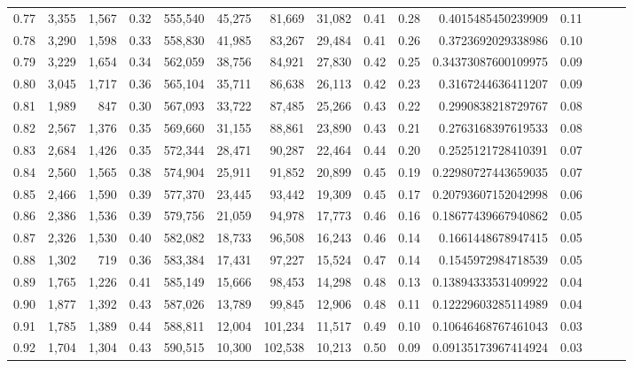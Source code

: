 \begin{tabular}{rrrrrrrrrrrrrrr}
0.77 &   3,355 &  1,567 &  0.32 &  555,540 &   45,275 &   81,669 &   31,082 &  0.41 &  0.28 &   0.4015485450239909 &      0.11 \\
0.78 &   3,290 &  1,598 &  0.33 &  558,830 &   41,985 &   83,267 &   29,484 &  0.41 &  0.26 &   0.3723692029338986 &      0.10 \\
0.79 &   3,229 &  1,654 &  0.34 &  562,059 &   38,756 &   84,921 &   27,830 &  0.42 &  0.25 &  0.34373087600109975 &      0.09 \\
0.80 &   3,045 &  1,717 &  0.36 &  565,104 &   35,711 &   86,638 &   26,113 &  0.42 &  0.23 &   0.3167244636411207 &      0.09 \\
0.81 &   1,989 &    847 &  0.30 &  567,093 &   33,722 &   87,485 &   25,266 &  0.43 &  0.22 &   0.2990838218729767 &      0.08 \\
0.82 &   2,567 &  1,376 &  0.35 &  569,660 &   31,155 &   88,861 &   23,890 &  0.43 &  0.21 &   0.2763168397619533 &      0.08 \\
0.83 &   2,684 &  1,426 &  0.35 &  572,344 &   28,471 &   90,287 &   22,464 &  0.44 &  0.20 &   0.2525121728410391 &      0.07 \\
0.84 &   2,560 &  1,565 &  0.38 &  574,904 &   25,911 &   91,852 &   20,899 &  0.45 &  0.19 &  0.22980727443659035 &      0.07 \\
0.85 &   2,466 &  1,590 &  0.39 &  577,370 &   23,445 &   93,442 &   19,309 &  0.45 &  0.17 &  0.20793607152042998 &      0.06 \\
0.86 &   2,386 &  1,536 &  0.39 &  579,756 &   21,059 &   94,978 &   17,773 &  0.46 &  0.16 &  0.18677439667940862 &      0.05 \\
0.87 &   2,326 &  1,530 &  0.40 &  582,082 &   18,733 &   96,508 &   16,243 &  0.46 &  0.14 &   0.1661448678947415 &      0.05 \\
0.88 &   1,302 &    719 &  0.36 &  583,384 &   17,431 &   97,227 &   15,524 &  0.47 &  0.14 &   0.1545972984718539 &      0.05 \\
0.89 &   1,765 &  1,226 &  0.41 &  585,149 &   15,666 &   98,453 &   14,298 &  0.48 &  0.13 &  0.13894333531409922 &      0.04 \\
0.90 &   1,877 &  1,392 &  0.43 &  587,026 &   13,789 &   99,845 &   12,906 &  0.48 &  0.11 &  0.12229603285114989 &      0.04 \\
0.91 &   1,785 &  1,389 &  0.44 &  588,811 &   12,004 &  101,234 &   11,517 &  0.49 &  0.10 &  0.10646468767461043 &      0.03 \\
0.92 &   1,704 &  1,304 &  0.43 &  590,515 &   10,300 &  102,538 &   10,213 &  0.50 &  0.09 &  0.09135173967414924 &      0.03 \\

\end{tabular}
